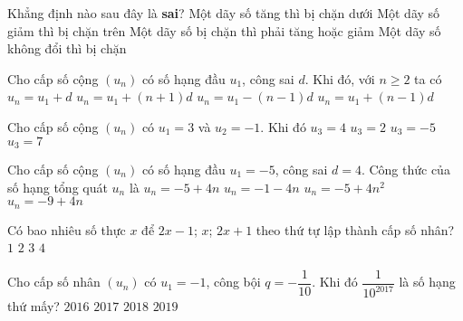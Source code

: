 \begin{ex}%
	Khẳng định nào sau đây là {\bf sai}?
	\choice
	{Một dãy số tăng thì bị chặn dưới}
	{Một dãy số giảm thì bị chặn trên}
	{\True Một dãy số bị chặn thì phải tăng hoặc giảm}
	{Một dãy số không đổi thì bị chặn}
\end{ex}
\begin{ex}%
	Cho cấp số cộng $(u_n)$ có số hạng đầu $u_1$, công sai $d$. Khi đó, với $n \geq 2$ ta có
	\choice
	{$u_n=u_1+d$}
	{$u_n=u_1+(n+1) d$}
	{$u_n=u_1-(n-1) d$}
	{\True $u_n=u_1+(n-1) d$}
\end{ex}

\begin{ex}%
	Cho cấp số cộng $(u_n)$ có $u_1=3$ và $u_2=-1$. Khi đó
	\choice
	{$u_3=4$}
	{$u_3=2$}
	{\True $u_3=-5$}
	{$u_3=7$}
\end{ex}
\begin{ex}%
	Cho cấp số cộng $(u_n)$ có số hạng đầu $u_1=-5$, công sai $d=4$. Công thức của số hạng tổng quát $u_n$ là
	\choice
	{$u_n=-5+4n$}
	{$u_n=-1-4n$}
	{$u_n=-5+4n^2$}
	{\True $u_n=-9+4n$}
\end{ex}
\begin{ex}%
	Có bao nhiêu số thực $x$ để $2x-1$; $x$; $2x+1$ theo thứ tự lập thành cấp số nhân?
	\choice
	{$1$}
	{\True $2$}
	{$3$}
	{$4$}
\end{ex}
\begin{ex}%
	Cho cấp số nhân $(u_n)$ có $u_1=-1$, công bội $q=-\dfrac{1}{10}$. Khi đó $\dfrac{1}{10^{2017}}$ là số hạng thứ mấy?
	\choice
	{$2016$}
	{$2017$}
	{\True $2018$}
	{$2019$}
\end{ex}
